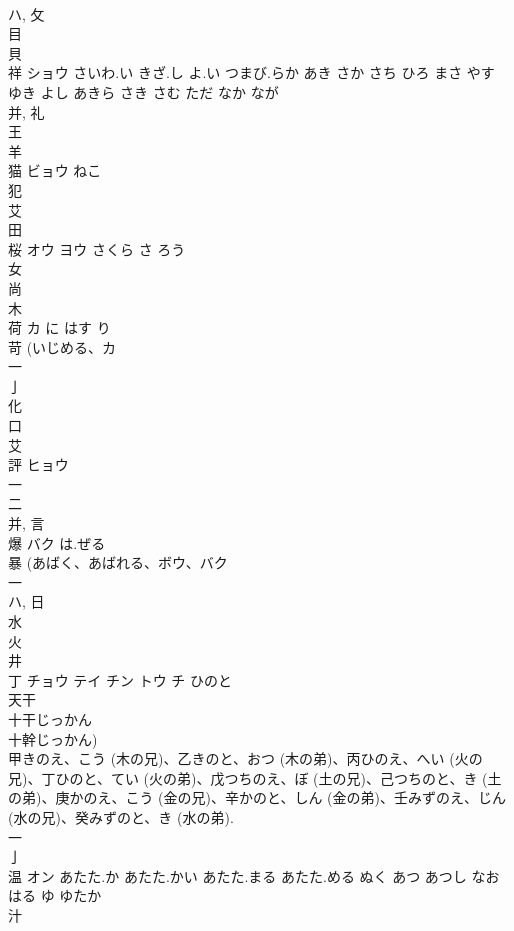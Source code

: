 \documentclass[8pt]{extreport}
\begin{document}
\begin{CJK}{UTF8}{min}
\\	ハ, 攵 
\\	目 
\\	貝 
\\	祥	ショウ	さいわ.い きざ.し よ.い つまび.らか あき さか さち ひろ まさ やす ゆき よし あきら さき さむ ただ なか なが	
\\	并, 礼 
\\	王 
\\	羊 
\\	猫	ビョウ	ねこ	
\\	犯 
\\	艾 
\\	田 
\\	桜	オウ ヨウ	さくら さ ろう	
\\	女 
\\	尚 
\\	木 
\\	荷	カ	に はす り	
\\	苛 (いじめる、カ 
\\	一 
\\	亅 
\\	化 
\\	口 
\\	艾 
\\	評	ヒョウ		
\\	一 
\\	二 
\\	并, 言 
\\	爆	バク	は.ぜる	
\\	暴 (あばく、あばれる、ボウ、バク 
\\	一 
\\	ハ, 日 
\\	水 
\\	火 
\\	井 
\\	丁	チョウ テイ チン トウ チ	ひのと	
\\	天干 
\\	十干じっかん 
\\	十幹じっかん) 
\\	甲きのえ、こう (木の兄)、乙きのと、おつ (木の弟)、丙ひのえ、へい (火の兄)、丁ひのと、てい (火の弟)、戊つちのえ、ぼ (土の兄)、己つちのと、き (土の弟)、庚かのえ、こう (金の兄)、辛かのと、しん (金の弟)、壬みずのえ、じん (水の兄)、癸みずのと、き (水の弟). 
\\	一 
\\	亅 
\\	温	オン	あたた.か あたた.かい あたた.まる あたた.める ぬく あつ あつし なお はる ゆ ゆたか	
\\	汁 

\end{CJK}
\end{document}
